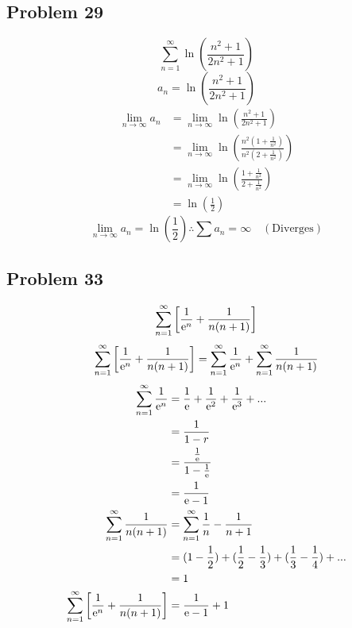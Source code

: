\documentclass{math}
\begin{document}
\subsection*{Problem 29}
\[ \sum_{n=1}^{\infty}\ln(\frac{n^{2}+1}{2n^{2}+1}) \]
\[ a_{n} = \ln(\frac{n^{2}+1}{2n^{2}+1}) \]
\begin{align*}
  \lim_{n\to\infty}a_{n} &= \lim_{n\to\infty}\ln(\frac{n^{2}+1}{2n^{2}+1}) \\
  &= \lim_{n\to\infty}
    \ln(\frac{n^{2}(1+\frac{1}{n^{2}})}{n^{2}(2+\frac{1}{n^{2}})}) \\
  &= \lim_{n\to\infty}
    \ln(\frac{1+\frac{1}{n^{2}}}{2+\frac{1}{n^{2}}}) \\
  &= \ln(\frac{1}{2})
\end{align*}
\[ \lim_{n\to\infty}a_{n} = \ln(\frac{1}{2}) \therefore
   \sum{a_{n}} = \infty \quad \mathrm{(Diverges)} \]

\subsection*{Problem 33}
\[ \sum_{n=1}^{\infty}\bigg[\frac{1}{\mathrm{e}^{n}}+\frac{1}{n(n+1)}\bigg] \]
\[ \sum_{n=1}^{\infty}\bigg[\frac{1}{\mathrm{e}^{n}}+\frac{1}{n(n+1)}\bigg] =
   \sum_{n=1}^{\infty}\frac{1}{\mathrm{e}^{n}}+\sum_{n=1}^{\infty}\frac{1}{n(n+1)} \]
\begin{align*}
  \sum_{n=1}^{\infty}\frac{1}{\mathrm{e}^{n}} &=
    \frac{1}{\mathrm{e}}+\frac{1}{\mathrm{e}^{2}}+\frac{1}{\mathrm{e}^{3}}+... \\
  &= \frac{1}{1-r} \\
  &= \frac{\frac{1}{\mathrm{e}}}{1-\frac{1}{\mathrm{e}}} \\
  &= \frac{1}{\mathrm{e}-1} \\
  \sum_{n=1}^{\infty}\frac{1}{n(n+1)} &=
    \sum_{n=1}^{\infty}\frac{1}{n}-\frac{1}{n+1} \\
  &= (1-\frac{1}{2})+(\frac{1}{2}-\frac{1}{3})+(\frac{1}{3}-\frac{1}{4})+... \\
  &= 1 \\
  \sum_{n=1}^{\infty}\bigg[\frac{1}{\mathrm{e}^{n}}+\frac{1}{n(n+1)}\bigg] &=
    \frac{1}{\mathrm{e}-1}+1
\end{align*}
\end{document}
